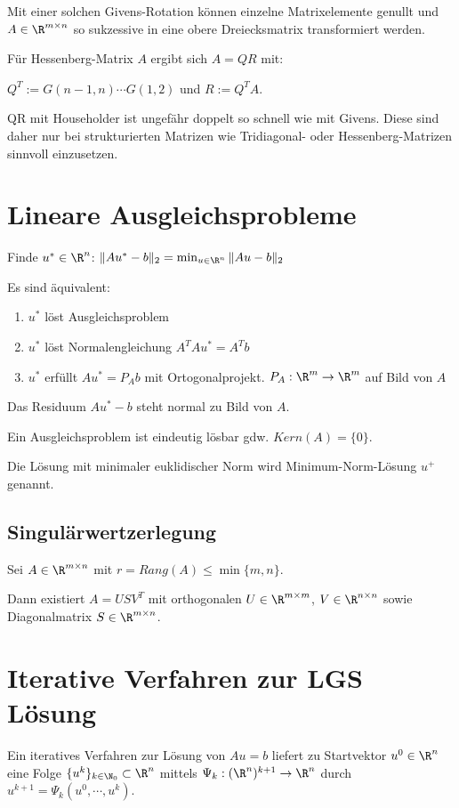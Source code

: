 Mit einer solchen Givens-Rotation können einzelne Matrixelemente genullt und $A \in \R^{m \times n}$ so sukzessive in eine obere Dreiecksmatrix transformiert werden.

Für Hessenberg-Matrix $A$ ergibt sich $A=QR$ mit:

$Q^T := G(n-1,n) \cdots G(1,2)$ und $R:=Q^T A$.

QR mit Householder ist ungefähr doppelt so schnell wie mit Givens. Diese sind daher nur bei strukturierten Matrizen wie Tridiagonal- oder Hessenberg-Matrizen sinnvoll einzusetzen.

\section*{Lineare Ausgleichsprobleme}

Finde $u^* \in \R^n$: $\|Au^*-b\|_2 = \min_{u\in \R^n} \|Au-b\|_2$

Es sind äquivalent:

\begin{enumerate}[label=(\alph*)]
	\item $u^*$ löst Ausgleichsproblem
	\item $u^*$ löst Normalengleichung $A^TAu^*=A^Tb$
	\item $u^*$ erfüllt $Au^* = P_Ab$ mit Ortogonalprojekt. $P_A : \R^m \rightarrow \R^m$ auf Bild von $A$
\end{enumerate}

Das Residuum $Au^*-b$ steht normal zu Bild von $A$.

Ein Ausgleichsproblem ist eindeutig lösbar gdw. $Kern(A) = \{0\}$.

Die Lösung mit minimaler euklidischer Norm wird Minimum-Norm-Lösung $u^+$ genannt.

\subsection*{Singulärwertzerlegung}

Sei $A \in \R^{m \times n}$ mit $r=Rang(A) \leq \min\{m,n\}$.

Dann existiert $A=USV^T$ mit orthogonalen $U \in \R^{m \times m}$, $V \in \R^{n \times n}$ sowie Diagonalmatrix $S \in \R^{m \times n}$.

\section*{Iterative Verfahren zur LGS Lösung}

Ein iteratives Verfahren zur Lösung von $Au=b$ liefert zu Startvektor $u^0 \in \R^n$ eine Folge $\{u^k\}_{k\in \N_0} \subset \R^n$ mittels $\Psi_k : (\R^n)^{k+1} \rightarrow \R^n$ durch $u^{k+1} = \Psi_k(u^0, \cdots, u^k)$.

